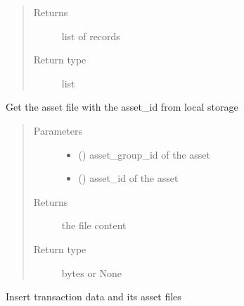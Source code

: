 \documentclass[letterpaper,10pt,english]{sphinxmanual}
\begin{document}
\begin{fulllineitems}
\begin{fulllineitems}
\begin{quote}
\begin{description}
\item[{Returns}] \leavevmode
list of records

\item[{Return type}] \leavevmode
list

\end{description}\end{quote}

\end{fulllineitems}


\begin{fulllineitems}
\label{\detokenize{bbc1.core.data_handler:bbc1.core.data_handler.DataHandlerDomain0.get_in_storage}}
Get the asset file with the asset\_id from local storage
\begin{quote}\begin{description}
\item[{Parameters}] \leavevmode\begin{itemize}
\item {} 
 () \textendash{} asset\_group\_id of the asset

\item {} 
 () \textendash{} asset\_id of the asset

\end{itemize}

\item[{Returns}] \leavevmode
the file content

\item[{Return type}] \leavevmode
bytes or None

\end{description}\end{quote}

\end{fulllineitems}


\begin{fulllineitems}
\label{\detokenize{bbc1.core.data_handler:bbc1.core.data_handler.DataHandlerDomain0.insert_transaction}}
Insert transaction data and its asset files


\end{fulllineitems}
\end{fulllineitems}
\end{document}
